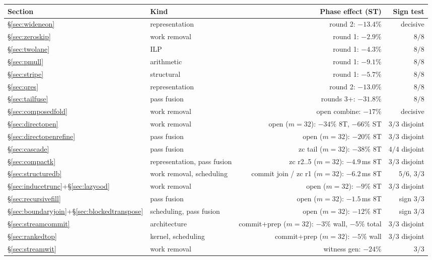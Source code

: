 \documentclass[11pt]{article}
\begin{document}
\begin{table}[h]
\centering
\small
\begin{tabular}{@{}llrr@{}}
\toprule
Section & Kind & Phase effect (ST) & Sign test\\
\midrule
\S\ref{sec:wideneon} & representation & round 2: $-13.4\%$ & decisive\\
\S\ref{sec:zeroskip} & work removal & round 1: $-2.9\%$ & $8/8$\\
\S\ref{sec:twolane} & ILP & round 1: $-4.3\%$ & $8/8$\\
\S\ref{sec:pmull} & arithmetic & round 1: $-9.1\%$ & $8/8$\\
\S\ref{sec:stripe} & structural & round 1: $-5.7\%$ & $8/8$\\
\S\ref{sec:qres} & representation & round 2: $-13.0\%$ & $8/8$\\
\S\ref{sec:tailfuse} & pass fusion & rounds 3+: $-31.8\%$ & $8/8$\\
\S\ref{sec:composedfold} & work removal & open combine: $-17\%$ & decisive\\
\S\ref{sec:directopen} & work removal & open ($m{=}32$): $-34\%$ 8T, $-66\%$ ST & $3/3$ disjoint\\
\S\ref{sec:directopenrefine} & pass fusion & open ($m{=}32$): $-20\%$ 8T & $3/3$ disjoint\\
\S\ref{sec:cascade} & pass fusion & zc tail ($m{=}32$): $-38\%$ 8T & $4/4$ disjoint\\
\S\ref{sec:compactk} & representation, pass fusion & zc r2..5 ($m{=}32$): $-4.9\,$ms 8T & $3/3$ disjoint\\
\S\ref{sec:structuredb} & work removal, scheduling & commit join / zc r1 ($m{=}32$): $-6.2\,$ms 8T & $5/6$, $3/3$\\
\S\ref{sec:inducetrunc}+\S\ref{sec:lazyood} & work removal & open ($m{=}32$): $-9\%$ 8T & $3/3$ disjoint\\
\S\ref{sec:recursivefill} & pass fusion & open ($m{=}32$): $-1.5\,$ms 8T & sign $3/3$\\
\S\ref{sec:boundaryjoin}+\S\ref{sec:blockedtranspose} & scheduling, pass fusion & open ($m{=}32$): $-12\%$ 8T & sign $3/3$\\
\S\ref{sec:streamcommit} & architecture & commit+prep ($m{=}32$): $-3\%$ wall, $-5\%$ total & $3/3$ disjoint\\
\S\ref{sec:rankedtop} & kernel, scheduling & commit+prep ($m{=}32$): $-5\%$ wall & $3/3$ disjoint\\
\S\ref{sec:streamwit} & work removal & witness gen: $-24\%$ & $3/3$\\

\end{tabular}
\end{table}
\end{document}
